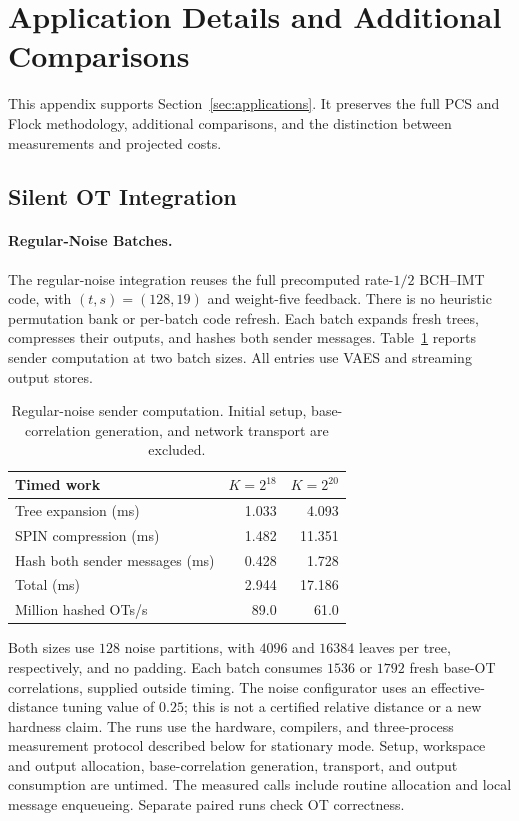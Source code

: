 \section{Application Details and Additional Comparisons}
\label{app:applications}

This appendix supports Section~\ref{sec:applications}.
It preserves the full PCS and Flock methodology, additional comparisons,
and the distinction between measurements and projected costs.

\subsection{Silent OT Integration}
\label{app:pcg-details}
\paragraph{Regular-Noise Batches.}
The regular-noise integration reuses the full precomputed rate-$1/2$ BCH--IMT code,
with $(t,s)=(128,19)$ and weight-five feedback. There is no heuristic
permutation bank or per-batch code refresh. Each batch expands fresh trees,
compresses their outputs, and hashes both sender messages.
Table~\ref{tab:spin-regular-current} reports sender computation
at two batch sizes. All entries use VAES and streaming output stores.

\begin{table}[!htbp]
\centering
\caption{Regular-noise sender computation. Initial setup,
base-correlation generation, and network transport are excluded.}
\label{tab:spin-regular-current}
\begin{tabular}{@{}lrr@{}}
\toprule
Timed work & $K=2^{18}$ & $K=2^{20}$ \\
\midrule
Tree expansion (ms) & 1.033 & 4.093 \\
SPIN compression (ms) & 1.482 & 11.351 \\
Hash both sender messages (ms) & 0.428 & 1.728 \\
Total (ms) & 2.944 & 17.186 \\
Million hashed OTs/s & 89.0 & 61.0 \\
\bottomrule
\end{tabular}
\end{table}

Both sizes use $128$ noise partitions, with $4096$ and $16384$ leaves
per tree, respectively, and no padding. Each batch consumes $1536$ or
$1792$ fresh base-OT correlations, supplied outside timing.
The noise configurator uses an effective-distance tuning value of $0.25$;
this is not a certified relative distance or a new hardness claim.
The runs use the hardware, compilers, and three-process measurement protocol
described below for stationary mode. Setup, workspace and output allocation,
base-correlation generation, transport, and output consumption are untimed.
The measured calls include routine allocation and local message enqueueing.
Separate paired runs check OT correctness.

